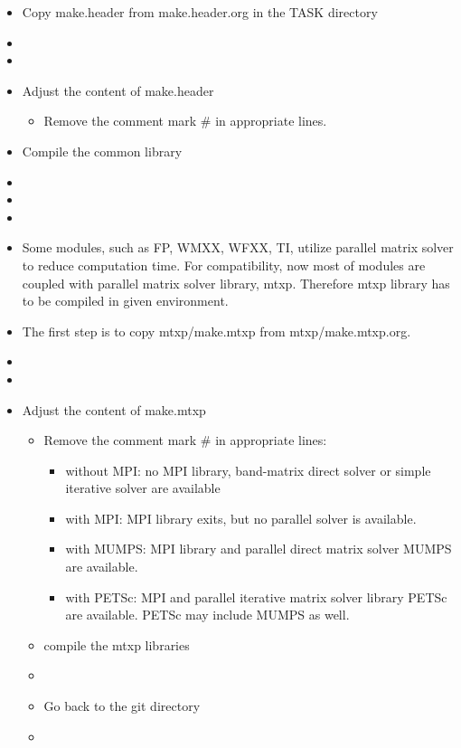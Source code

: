 \documentclass[11pt]{article}
\begin{document}
\begin{itemize}
\item
Copy make.header from make.header.org in the TASK directory 
\item[\qquad]
\item[\qquad]
\item
Adjust the content of make.header
\begin{itemize}
\item
Remove the comment mark \# in appropriate lines.
\end{itemize}
\item
Compile the common library
\item[\qquad]
\item[\qquad]
\item[\qquad]

\item
Some modules, such as FP, WMXX, WFXX, TI, utilize parallel matrix
solver to reduce computation time.  For compatibility, now most of
modules are coupled with parallel matrix solver library, mtxp.
Therefore mtxp library has to be compiled in given environment. 
\item
The first step is to copy mtxp/make.mtxp from mtxp/make.mtxp.org.
\item[\qquad]
\item[\qquad]
\item
Adjust the content of make.mtxp
\begin{itemize}
\item
Remove the comment mark \# in appropriate lines:
\begin{itemize}
\item
without MPI: no MPI library, band-matrix direct solver or simple
iterative solver are available
\item
with MPI: MPI library exits, but no parallel solver is available.
\item
with MUMPS: MPI library and parallel direct matrix solver MUMPS are available.
\item
with PETSc: MPI and parallel iterative   matrix solver library PETSc
are available.  PETSc may include MUMPS as well.
\end{itemize}
\item
compile the mtxp libraries
\item[\qquad]
\item
Go back to the git directory
\item[\qquad]
\end{itemize}
\end{itemize}
\end{document}
